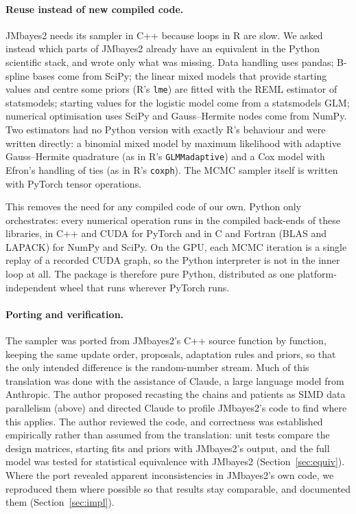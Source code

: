 \documentclass[11pt]{article}
\begin{document}
\paragraph{Reuse instead of new compiled code.} JMbayes2 needs its sampler in C++ because
loops in R are slow. We asked instead which parts of JMbayes2 already have an equivalent in
the Python scientific stack, and wrote only what was missing. Data handling uses pandas;
B-spline bases come from SciPy; the linear mixed models that provide starting values and
centre some priors (R's \texttt{lme}) are fitted with the REML estimator of statsmodels;
starting values for the logistic model come from a statsmodels GLM; numerical optimisation
uses SciPy and Gauss--Hermite nodes come from NumPy. Two estimators had no Python version
with exactly R's behaviour and were written directly: a binomial mixed model by maximum
likelihood with adaptive Gauss--Hermite quadrature (as in R's \texttt{GLMMadaptive}) and a
Cox model with Efron's handling of ties (as in R's \texttt{coxph}). The MCMC sampler itself
is written with PyTorch tensor operations.

This removes the need for any compiled code of our own. Python only orchestrates: every
numerical operation runs in the compiled back-ends of these libraries, in C++ and CUDA
for PyTorch and in C and Fortran (BLAS and LAPACK) for NumPy and SciPy. On the GPU, each
MCMC iteration is a single replay of a recorded CUDA graph, so the Python interpreter is
not in the inner loop at all. The package is therefore pure Python, distributed as one
platform-independent wheel that runs wherever PyTorch runs.

\paragraph{Porting and verification.} The sampler was ported from JMbayes2's C++ source
function by function, keeping the same update order, proposals, adaptation rules and
priors, so that the only intended difference is the random-number stream. Much of this
translation was done with the assistance of Claude, a large language model from
Anthropic. The author proposed recasting the chains and patients as SIMD data parallelism
(above) and directed Claude to profile JMbayes2's code to find where this applies. The
author reviewed the code, and correctness was established empirically rather
than assumed from the translation: unit tests compare the design matrices, starting
fits and priors with JMbayes2's output, and the full model was tested for statistical equivalence with JMbayes2
(Section~\ref{sec:equiv}). Where the port revealed apparent inconsistencies in JMbayes2's own
code, we reproduced them where possible so that results stay comparable, and documented
them (Section~\ref{sec:impl}).
\end{document}
